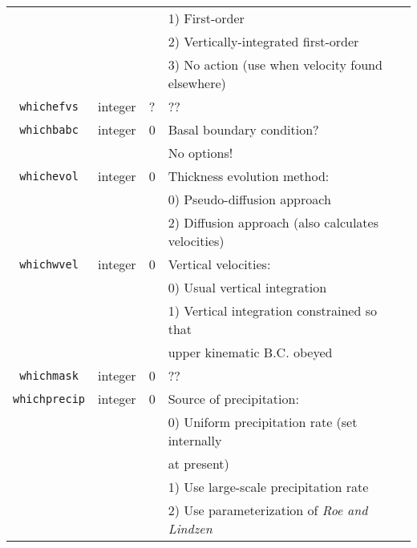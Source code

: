 \begin{center}
\begin{tabular}{|c|c|c|l|}
 & & & 1) First-order \\
 & & & 2) Vertically-integrated first-order \\
 & & & 3) No action (use when velocity found elsewhere) \\
\hline
\texttt{whichefvs} & integer & ? & ?? \\
\hline
\texttt{whichbabc} & integer & 0 & Basal boundary condition? \\
 & & & No options!\\
\hline
\texttt{whichevol} & integer & 0 & Thickness evolution method:\\
 & & & 0) Pseudo-diffusion approach \\
 & & & 2) Diffusion approach (also calculates velocities) \\
\hline 
\texttt{whichwvel} & integer & 0 & Vertical velocities: \\
 & & & 0) Usual vertical integration \\
 & & & 1) Vertical integration constrained so that \\
 & & & upper kinematic B.C. obeyed \\
\hline 
\texttt{whichmask} & integer & 0 & ?? \\
\hline
\texttt{whichprecip} & integer & 0 & Source of precipitation:\\
 & & & 0) Uniform precipitation rate (set internally \\
 & & &  at present) \\
 & & & 1) Use large-scale precipitation rate \\
 & & & 2) Use parameterization of \emph{Roe and Lindzen} \\
\hline
\end{tabular}
\end{center}
%
